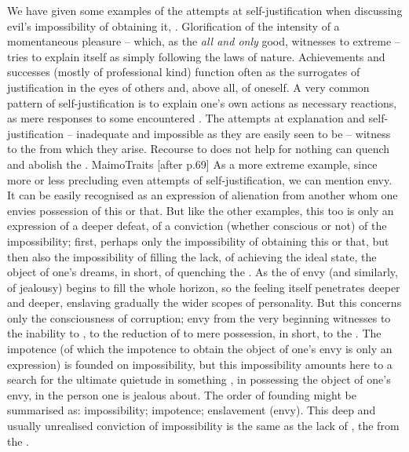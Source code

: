{We have given some examples of the attempts at self-justification when
discussing evil's impossibility of obtaining it,
. Glorification of the intensity of a momentaneous
pleasure -- which, as the {\em all and only} good, witnesses to extreme
 -- tries to explain itself as simply following the laws of
nature. Achievements and successes (mostly of professional kind) function often
as the surrogates of justification in the eyes of others and, above all, of
oneself. A very common pattern of self-justification is to explain one's own actions
as necessary reactions, as mere responses to some encountered .
The attempts at explanation and self-justification -- inadequate and impossible
as they are easily seen to be -- witness to the  from which they
arise. Recourse to  does not help for nothing  can
quench  and abolish the .
\citet{He that loves silver shall not be satisfied with silver.}{MaimoTraits}{
  [after p.69]}
As a more extreme example, since more or less precluding even attempts of
self-justification, we can mention envy. 
It can be easily recognised as an expression of alienation from another whom
one envies possession of this or that. But like the other examples, this too 
is only an  expression of a deeper
defeat, of a conviction (whether conscious or not) of the impossibility; first,
perhaps only the impossibility of obtaining this or that, but then also the 
impossibility of filling the lack, of achieving the ideal state, the object of
one's dreams, in short, of quenching the . As the  of
envy (and similarly, of jealousy) begins to fill the whole horizon, so the feeling itself
penetrates deeper and deeper, enslaving gradually the wider scopes of
personality.
But this  concerns only the consciousness of
corruption; envy from the very beginning witnesses to the inability to
, to the reduction of  to mere possession, in short, to
the .  The impotence (of which the impotence to obtain the object
of one's envy is only an expression) is founded on impossibility, but this
impossibility amounts here to a search for the ultimate quietude in something
, in possessing the object of one's envy, in  the
person one is jealous about. The order of founding might be summarised as: \inv
impossibility; \mine impotence; \act enslavement (envy).  This deep and usually
unrealised conviction of impossibility is the same as the lack of
, the  from the .

}
